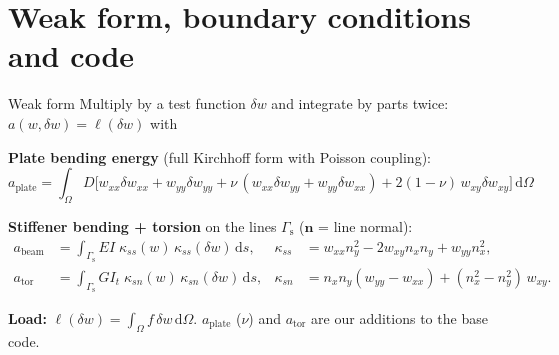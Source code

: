 \documentclass[10pt,c,intlimits,aspectratio=1610]{beamer}
\newcommand{\Om}{\Omega}
\newcommand{\dd}{\,\mathrm{d}}
\newcommand{\Gs}{\Gamma_{\mathrm s}}
\newcommand{\highlight}[1]{{\color{dpRed}#1}}
\begin{document}
\section{Weak form, boundary conditions and code}

\begin{frame}{Weak form}
  Multiply by a test function $\delta w$ and integrate by parts twice:
  $a(w,\delta w)=\ell(\delta w)$ with
  \medskip

  \textbf{Plate bending energy} (full Kirchhoff form with Poisson coupling):
  \begin{equation*}
    a_{\text{plate}}=\!\int_\Om \! D\Big[
      w_{xx}\delta w_{xx}+w_{yy}\delta w_{yy}
      +\nu\,(w_{xx}\delta w_{yy}+w_{yy}\delta w_{xx})
      +2(1-\nu)\,w_{xy}\delta w_{xy}\Big]\dd\Om
  \end{equation*}

  \textbf{Stiffener bending + torsion} on the lines $\Gs$
  ($\boldsymbol n$ = line normal):
  \begin{align*}
    a_{\text{beam}}&=\int_{\Gs} EI\;\kappa_{ss}(w)\,\kappa_{ss}(\delta w)\dd s,
       &\kappa_{ss}&= w_{xx}n_y^2-2w_{xy}n_xn_y+w_{yy}n_x^2,\\[1mm]
    a_{\text{tor}}&=\int_{\Gs} GI_t\;\kappa_{sn}(w)\,\kappa_{sn}(\delta w)\dd s,
       &\kappa_{sn}&= n_xn_y(w_{yy}-w_{xx})+(n_x^2-n_y^2)\,w_{xy}.
  \end{align*}

  \textbf{Load:}\; $\ell(\delta w)=\int_\Om f\,\delta w\dd\Om$.
  \hfill{\footnotesize\highlight{$a_{\text{plate}}$ ($\nu$) and $a_{\text{tor}}$ are our additions to the base code.}}
\end{frame}
\end{document}

